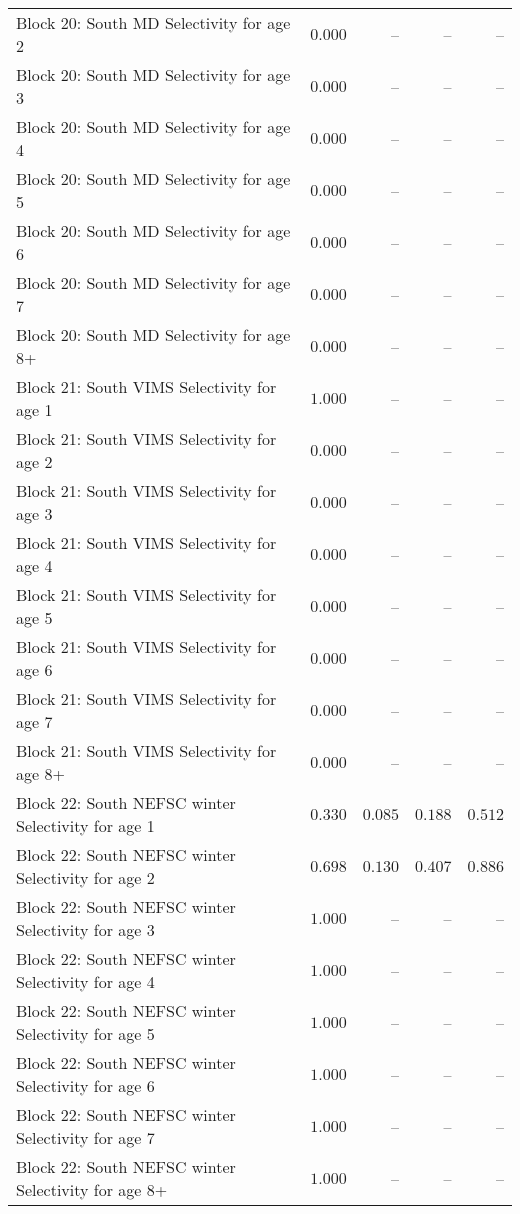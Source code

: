 \documentclass[
]{article}
\begin{document}
\begin{landscape}
\begin{longtable}[t]{lrrrr}
\addlinespace
Block 20: South MD Selectivity for age 2 & $0.000$ & -- & -- & --\\
Block 20: South MD Selectivity for age 3 & $0.000$ & -- & -- & --\\
Block 20: South MD Selectivity for age 4 & $0.000$ & -- & -- & --\\
Block 20: South MD Selectivity for age 5 & $0.000$ & -- & -- & --\\
Block 20: South MD Selectivity for age 6 & $0.000$ & -- & -- & --\\
\addlinespace
Block 20: South MD Selectivity for age 7 & $0.000$ & -- & -- & --\\
Block 20: South MD Selectivity for age 8+ & $0.000$ & -- & -- & --\\
Block 21: South VIMS Selectivity for age 1 & $1.000$ & -- & -- & --\\
Block 21: South VIMS Selectivity for age 2 & $0.000$ & -- & -- & --\\
Block 21: South VIMS Selectivity for age 3 & $0.000$ & -- & -- & --\\
\addlinespace
Block 21: South VIMS Selectivity for age 4 & $0.000$ & -- & -- & --\\
Block 21: South VIMS Selectivity for age 5 & $0.000$ & -- & -- & --\\
Block 21: South VIMS Selectivity for age 6 & $0.000$ & -- & -- & --\\
Block 21: South VIMS Selectivity for age 7 & $0.000$ & -- & -- & --\\
Block 21: South VIMS Selectivity for age 8+ & $0.000$ & -- & -- & --\\
\addlinespace
Block 22: South NEFSC winter Selectivity for age 1 & $0.330$ & $0.085$ & $0.188$ & $0.512$\\
Block 22: South NEFSC winter Selectivity for age 2 & $0.698$ & $0.130$ & $0.407$ & $0.886$\\
Block 22: South NEFSC winter Selectivity for age 3 & $1.000$ & -- & -- & --\\
Block 22: South NEFSC winter Selectivity for age 4 & $1.000$ & -- & -- & --\\
Block 22: South NEFSC winter Selectivity for age 5 & $1.000$ & -- & -- & --\\
\addlinespace
Block 22: South NEFSC winter Selectivity for age 6 & $1.000$ & -- & -- & --\\
Block 22: South NEFSC winter Selectivity for age 7 & $1.000$ & -- & -- & --\\
Block 22: South NEFSC winter Selectivity for age 8+ & $1.000$ & -- & -- & --\\

\end{longtable}
\end{landscape}
\end{document}
